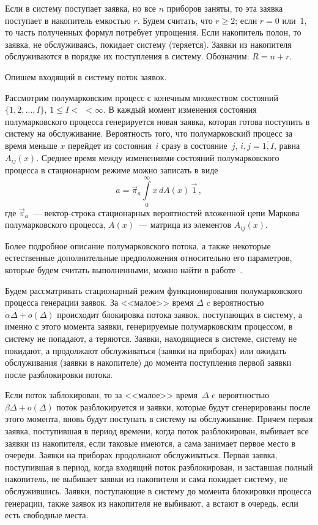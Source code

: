 \begin{multicols}{2}
Если в систему поступает заявка, но все $n$ приборов заняты,
то эта заявка поступает в накопитель емкостью $r$.
Будем считать, что $r\ge 2$; если $r=0$ или~1,
то часть полученных формул потребует упрощения.
Если накопитель полон,
то заявка, не обслуживаясь, покидает систему (теряется).
Заявки из накопителя обслуживаются в порядке их поступления в систему.
Обозначим: $R=n+r$.

Опишем входящий в систему поток заявок.

Рассмотрим полумарковским процесс с конечным множеством состояний $\{1,2,\ldots,I\}$, $1\le I<$\linebreak
$<\infty$.
В каждый момент изменения состояния полумарковского процесса генерируется новая заявка,
которая готова поступить в систему на обслуживание.
Вероятность того, что полумарковский процесс за время меньше $x$ перейдет из состояния~$i$
сразу в состояние~$j$, $i,j=\overline{1,I}$, равна $A_{ij}(x)$.
Среднее время между изменениями состояний полумарковского процесса в стационарном режиме можно записать в виде
%
\begin{equation}
a = \vec\pi_a \int\limits_0^\infty x\, dA(x)\, \vec1\,,
\label{a}
\end{equation}
где $\vec\pi_a$~--- вектор-строка стационарных вероятностей вложенной цепи Маркова полумарковского процесса,
$A(x)$~--- матрица из элементов $A_{ij}(x)$.

Более подробное описание полумарковского потока,
а также некоторые естественные дополнительные предположения относительно его параметров,
которые будем считать выполненными, можно найти в работе~\cite{PCh04}.

Будем рассматривать стационарный режим функционирования
полумарковского процесса генерации заявок. За <<малое>> время
$\Delta$ c вероятностью $\alpha \Delta+o(\Delta)$ происходит
блокировка потока заявок, поступающих в систему, а именно с
этого момента заявки, генерируемые полумарковским процессом, в
систему не попадают, а теряются. Заявки, находящиеся в системе,
систему не покидают, а продолжают обслуживаться (заявки на приборах)
или ожидать обслуживания (заявки в накопителе) до момента
поступления первой заявки после разблокировки потока.

Если поток
заблокирован, то за <<малое>> время~$\Delta$ c вероятностью $\beta
\Delta+o(\Delta)$ поток разблокируется и заявки, которые будут
сгенерированы после этого момента, вновь будут поступать в систему
на обслуживание. Причем первая заявка, поступившая в период времени,
когда поток разблокирован, выбивает все заявки из
накопителя, если таковые имеются, а сама занимает первое место в
очереди. Заявки на приборах продолжают обслуживаться.
Первая заявка, поступившая в период, когда входящий поток разблокирован,
и заставшая полный накопитель, не выбивает заявки из накопителя и сама
покидает систему, не обслужившись. Заявки, поступающие в
систему до момента блокировки процесса генерации,
также заявок из накопителя не выбивают,
а встают в очередь, если есть свободные места.


\end{multicols}
